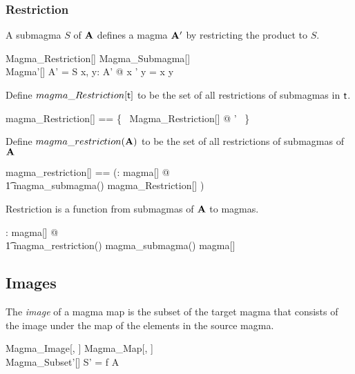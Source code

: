 \documentclass{amsart}
\begin{document}
\subsubsection{Restriction}

A submagma $S$ of $\mathbf{A}$ defines a magma $\mathbf{A}'$ by restricting the
product to $S$.

\begin{schema}{Magma\_Restriction}[\genT]
	Magma\_Submagma[\genT] \\
	Magma'[\genT]
\where
	A' = S
\also
	\forall x, y: A' @ x \opG' y = x \opG y
\end{schema}

Define $magma\_Restriction[\mathsf{t}]$ to be the set of all restrictions of submagmas in $\mathsf{t}$.

\begin{zed}
	magma\_Restriction[\genT] == \{~ Magma\_Restriction[\genT] @ \strucS \mapsto \strucA' ~\}
\end{zed}

Define $magma\_restriction(\mathbf{A})$ to be the set of all restrictions of submagmas of $\mathbf{A}$

\begin{zed}
	magma\_restriction[\genT] == (\lambda \strucA: magma[\genT] @ \\
	\t1	magma\_submagma(\strucA) \dres magma\_Restriction[\genT] )
\end{zed}

\begin{remark}
Restriction is a function from submagmas of $\mathbf{A}$ to magmas.

\begin{zed}
	\forall \strucA: magma[\setT] @ \\
	\t1	magma\_restriction(\strucA) \in magma\_submagma(\strucA) \fun magma[\setT]
\end{zed}

\end{remark}

\subsection{Images}

The \textit{image} of a magma map is the subset of the target magma that consists of
the image under the map of the elements in the source magma.

\begin{schema}{Magma\_Image}[\genT, \genU]
	Magma\_Map[\genT, \genU] \\
	Magma\_Subset'[\genU]
\where
	S' = f \limg A \rimg
\end{schema}
\end{document}
